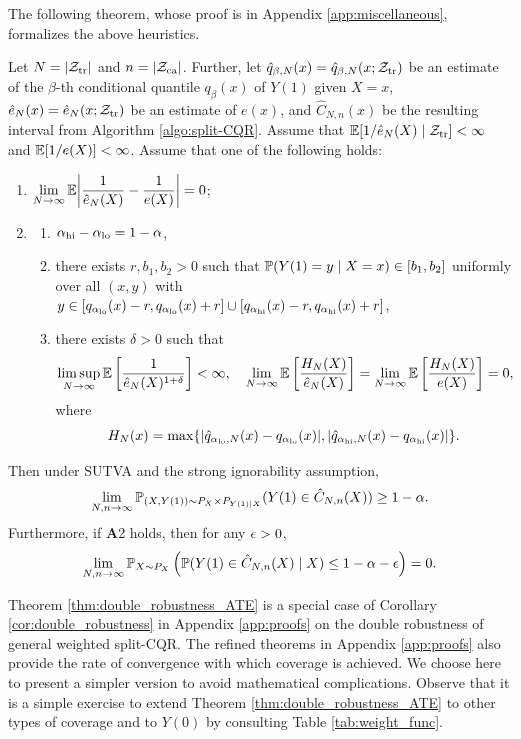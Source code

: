 The following theorem, whose proof is in Appendix
\ref{app:miscellaneous}, formalizes the above heuristics. 
\begin{theorem}\label{thm:double_robustness_ATE}
  Let $N = |\Z_{\tr}|$ and $n = |\Z_{\ca}|$. Further, let
  $\hat{q}_{\beta, N}(x) = \hat{q}_{\beta, N}(x; \Z_{\tr})$ be an
  estimate of the $\beta$-th conditional quantile $q_{\beta}(x)$ of
  $Y(1)$ given $X = x$, $\hat{e}_{N}(x) = \hat{e}_{N}(x; \Z_{\tr})$ be
  an estimate of $e(x)$, and $\hat{C}_{N, n}(x)$ be the resulting
  interval from Algorithm \ref{algo:split-CQR}. Assume that
  $\E[1 / \hat{e}_{N}(X)\mid \Z_{\tr}] < \infty$ and
  $\E[1 / e(X)] < \infty$. Assume that one of the following holds:
    \begin{enumerate}[\textbf{A}1]
  \item $\displaystyle \lim_{N\rightarrow \infty}\E\bigg|\frac{1}{\hat{e}_{N}(X)} - \frac{1}{e(X)}\bigg| = 0$;
  \item
    \begin{enumerate}[(1)]
    \item $\alpha_{\hi} - \alpha_{\lo} = 1 - \alpha$,
    \item there exists $r, b_{1}, b_{2} > 0$ such that
      $\P(Y(1) = y \mid X = x) \in [b_{1}, b_{2}]$ uniformly over all
      $(x, y)$ with
      $y\in [q_{\alpha_{\lo}}(x) - r, q_{\alpha_{\lo}}(x) + r]\cup
      [q_{\alpha_{\hi}}(x) - r, q_{\alpha_{\hi}}(x) + r]$, 
    \item there exists $\delta > 0$ such that
      \[\limsup_{N\rightarrow \infty}\E\left[\frac{1}{\hat{e}_{N}(X)^{1 + \delta}}\right] < \infty, \quad \lim_{N\rightarrow \infty}\E\left[\frac{H_{N}(X)}{\hat{e}_{N}(X)}\right] = \lim_{N\rightarrow \infty}\E\left[\frac{H_{N}(X)}{e(X)}\right] = 0,\]
      where
      \[\displaystyle H_{N}(x) = \max\{|\hat{q}_{\alpha_{\lo}, N}(x) - q_{\alpha_{\lo}}(x)|, |\hat{q}_{\alpha_{\hi}, N}(x) - q_{\alpha_{\hi}}(x)|\}.\]
     \end{enumerate}
  \end{enumerate}
  Then under SUTVA and the strong ignorability assumption,
  \begin{equation}
    \label{eq:unconditional_coverage}
    \lim_{N, n\rightarrow\infty}\P_{(X, Y(1))\sim P_{X}\times P_{Y(1)\mid X}}(Y(1) \in \hat{C}_{N, n}(X))\ge 1 - \alpha.
  \end{equation}
  Furthermore, if \textbf{A}2 holds, then for any $\eps > 0$,
  \begin{equation}
    \label{eq:conditional_coverage}
    \lim_{N, n\rightarrow\infty}\P_{X\sim P_{X}}\lb \P(Y(1)\in \hat{C}_{N, n}(X)\mid X)\le 1 - \alpha - \eps\rb = 0.
  \end{equation}
\end{theorem}
Theorem \ref{thm:double_robustness_ATE} is a special case of Corollary
\ref{cor:double_robustness} in Appendix \ref{app:proofs} on the double
robustness of general weighted split-CQR. The refined
  theorems in Appendix \ref{app:proofs} also provide the rate of
  convergence with which coverage is achieved. We choose here to
  present a simpler version to avoid mathematical
  complications. Observe that it is a simple exercise to extend
Theorem \ref{thm:double_robustness_ATE} to other types of coverage and
to $Y(0)$ by consulting Table \ref{tab:weight_func}.

